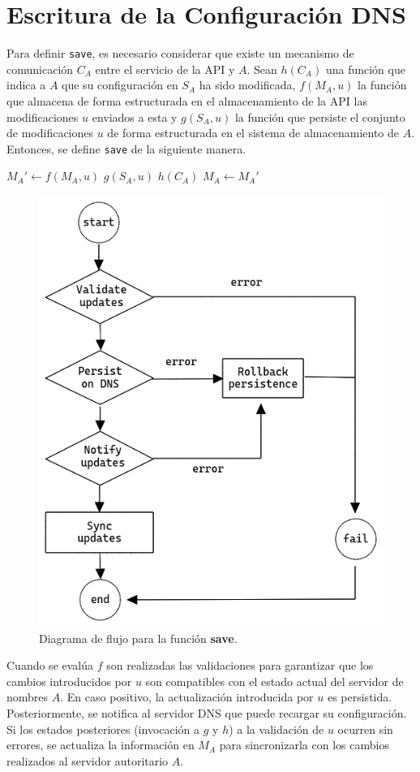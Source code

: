 \section{Escritura de la Configuración DNS}

Para definir \verb+save+, es necesario considerar que existe un mecanismo de comunicación $C_A$ entre el servicio de la API y $A$. Sean $h(C_A)$ una función que indica a $A$ que su configuración en $S_A$ ha sido modificada, $f(M_A, u)$ la función que almacena de forma estructurada en el almacenamiento de la API las modificaciones $u$ enviados a esta y $g(S_A, u)$ la función que persiste el conjunto de modificaciones $u$ de forma estructurada en el sistema de almacenamiento de $A$. Entonces, se define \verb+save+ de la siguiente manera.

\begin{algorithmic}
    \State $M_A' \leftarrow f(M_A, u)$
    \State $g(S_A, u)$
    \State $h(C_A)$
    \State $M_A \leftarrow M_A'$
\EndProcedure
\end{algorithmic}

\begin{figure}[!ht]
    \centering
    \includegraphics[width=0.6\linewidth]{draws/save.png}
    \caption{Diagrama de flujo para la función \textbf{save}.}
\end{figure}

Cuando se evalúa $f$ son realizadas las validaciones para garantizar que los cambios introducidos por $u$ son compatibles con el estado actual del servidor de nombres $A$. En caso positivo, la actualización introducida por $u$ es persistida. Posteriormente, se notifica al servidor DNS que puede recargar su configuración. Si los estados posteriores (invocación a $g$ y $h$) a la validación de $u$ ocurren sin errores, se actualiza la información en $M_A$ para sincronizarla con los cambios realizados al servidor autoritario $A$.

